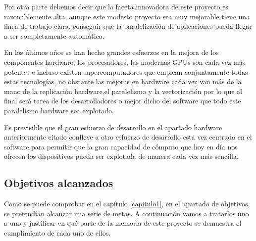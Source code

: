 Por otra parte debemos decir que la faceta innovadora de este proyecto es razonablemente alta, aunque este modesto proyecto sea muy mejorable tiene una linea de trabajo clara, conseguir que la paralelización de aplicaciones pueda llegar a ser completamente automática. 

En los últimos años se han hecho grandes esfuerzos en la mejora de los componentes hardware, los procesadores, las modernas GPUs son cada vez más potentes e incluso existen supercomputadores que emplean conjuntamente todas estas tecnologías, no obstante las mejoras en hardware cada vez van más de la mano de la replicación hardware,el paralelismo y la vectorización por lo que al final será tarea de los desarrolladores o mejor dicho del software que todo este paralelismo hardware sea explotado.

Es previsible que el gran esfuerzo de desarrollo en el apartado hardware anteriormente citado conlleve a otro esfuerzo de desarrollo esta vez centrado en el software para permitir que la gran capacidad de cómputo que hoy en día nos ofrecen los dispositivos pueda ser explotada de manera cada vez más sencilla. 


\subsection{Objetivos alcanzados}
Como se puede comprobar en el capítulo \ref{capitulo1}, en el apartado de objetivos, se pretendían alcanzar una serie de metas. A continuación vamos a tratarlos uno a uno y justificar en qué parte de la memoria de este proyecto se demuestra el cumplimiento de cada uno de ellos.

